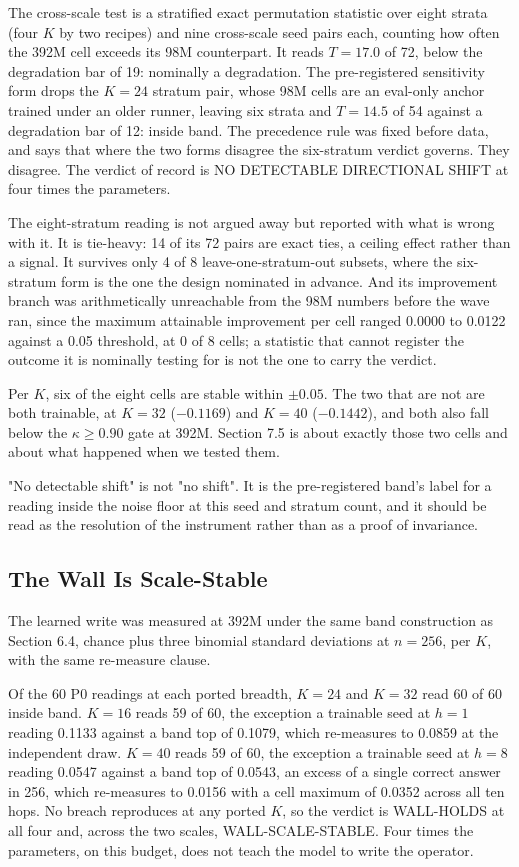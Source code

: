 The cross-scale test is a stratified exact permutation statistic over
eight strata (four $K$ by two recipes) and nine cross-scale seed pairs
each, counting how often the 392M cell exceeds its 98M counterpart. It
reads $T = 17.0$ of 72, below the degradation bar of 19: nominally a
degradation. The pre-registered sensitivity form drops the $K{=}24$
stratum pair, whose 98M cells are an eval-only anchor trained under an
older runner, leaving six strata and $T = 14.5$ of 54 against a
degradation bar of 12: inside band. The precedence rule was fixed before
data, and says that where the two forms disagree the six-stratum verdict
governs. They disagree. The verdict of record is NO DETECTABLE
DIRECTIONAL SHIFT at four times the parameters.

The eight-stratum reading is not argued away but reported with what is
wrong with it. It is tie-heavy: 14 of its 72 pairs are exact ties, a
ceiling effect rather than a signal. It survives only 4 of 8
leave-one-stratum-out subsets, where the six-stratum form is the one the
design nominated in advance. And its improvement branch was
arithmetically unreachable from the 98M numbers before the wave ran,
since the maximum attainable improvement per cell ranged 0.0000 to
0.0122 against a 0.05 threshold, at 0 of 8 cells; a statistic that
cannot register the outcome it is nominally testing for is not the one
to carry the verdict.

Per $K$, six of the eight cells are stable within $\pm 0.05$. The two
that are not are both trainable, at $K{=}32$ ($-0.1169$) and $K{=}40$
($-0.1442$), and both also fall below the $\kappa \geq 0.90$ gate at
392M. Section 7.5 is about exactly those two cells and about what
happened when we tested them.

"No detectable shift" is not "no shift". It is the pre-registered band's
label for a reading inside the noise floor at this seed and stratum
count, and it should be read as the resolution of the instrument rather
than as a proof of invariance.

\subsection{The Wall Is Scale-Stable}

The learned write was measured at 392M under the same band construction
as Section 6.4, chance plus three binomial standard deviations at
$n{=}256$, per $K$, with the same re-measure clause.

Of the 60 P0 readings at each ported breadth, $K{=}24$ and $K{=}32$ read
60 of 60 inside band. $K{=}16$ reads 59 of 60, the exception a trainable
seed at $h{=}1$ reading 0.1133 against a band top of 0.1079, which
re-measures to 0.0859 at the independent draw. $K{=}40$ reads 59 of 60,
the exception a trainable seed at $h{=}8$ reading 0.0547 against a band
top of 0.0543, an excess of a single correct answer in 256, which
re-measures to 0.0156 with a cell maximum of 0.0352 across all ten hops.
No breach reproduces at any ported $K$, so the verdict is WALL-HOLDS at
all four and, across the two scales, WALL-SCALE-STABLE. Four times the
parameters, on this budget, does not teach the model to write the
operator.


